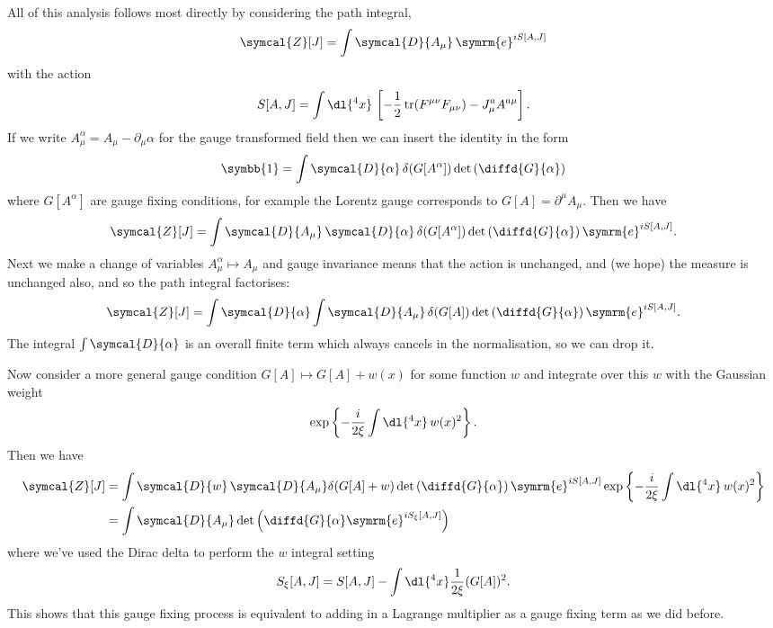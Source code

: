 \documentclass[fleqn]{NotesClass}
\newcommand{\e}{\symrm{e}}
\newcommand{\DL}[1]{\symcal{D}{#1}}
\newcommand{\DD}[1]{\,\symcal{D}{#1}}
\DeclareMathOperator{\tr}{tr}
\newcommand{\identityMatrix}{\symbb{1}}
\newcommand{\partitionFunction}{\symcal{Z}}
\begin{document}
    All of this analysis follows most directly by considering the path integral,
    \begin{equation}
        \partitionFunction[J] = \int \DL{A_\mu} \, \e^{iS[A, J]}
    \end{equation}
    with the action
    \begin{equation}
        S[A, J] = \int \dl{^4x} \, \left[ -\frac{1}{2}\tr(F^{\mu\nu} F_{\mu\nu}) - J^a_\mu A^{a\mu} \right].
    \end{equation}
    If we write \(A_\mu^\alpha = A_\mu - \partial_\mu \alpha\) for the gauge transformed field then we can insert the identity in the form
    \begin{equation}
        \identityMatrix = \int \DL{\alpha} \, \delta(G[A^\alpha]) \det\left( \diffd{G}{\alpha} \right)
    \end{equation}
    where \(G[A^\alpha]\) are gauge fixing conditions, for example the Lorentz gauge corresponds to \(G[A] = \partial^\mu A_\mu\).
    Then we have
    \begin{equation}
        \partitionFunction[J] = \int \DL{A_\mu} \DD{\alpha} \, \delta(G[A^\alpha]) \det\left( \diffd{G}{\alpha} \right) \e^{iS[A, J]}.
    \end{equation}
    Next we make a change of variables \(A_\mu^\alpha \mapsto A_\mu\) and gauge invariance means that the action is unchanged, and (we hope) the measure is unchanged also, and so the path integral factorises:
    \begin{equation}
        \partitionFunction[J] = \int\DL{\alpha} \int\DL{A_\mu} \, \delta(G[A]) \det\left( \diffd{G}{\alpha} \right) \e^{iS[A, J]}.
    \end{equation}
    The integral \(\int\DL{\alpha}\) is an overall finite term which always cancels in the normalisation, so we can drop it.
    
    Now consider a more general gauge condition \(G[A] \mapsto G[A] + w(x)\) for some function \(w\) and integrate over this \(w\) with the Gaussian weight
    \begin{equation}
        \exp\left\{ -\frac{i}{2\xi} \int \dl{^4x} \, w(x)^2 \right\}.
    \end{equation}
    Then we have
    \begin{align}
        \partitionFunction[J] &= \int \DL{w} \DD{A_\mu} \delta(G[A] + w) \det\left( \diffd{G}{\alpha} \right) \e^{iS[A, J]} \exp\left\{ -\frac{i}{2\xi} \int \dl{^4x} \, w(x)^2 \right\}\\
        &= \int \DL{A_\mu} \det\left( \diffd{G}{\alpha} \e^{iS_\xi[A, J]} \right)
    \end{align}
    where we've used the Dirac delta to perform the \(w\) integral setting
    \begin{equation}
        S_\xi[A, J] = S[A, J] - \int \dl{^4x} \frac{1}{2\xi}(G[A])^2.
    \end{equation}
    This shows that this gauge fixing process is equivalent to adding in a Lagrange multiplier as a gauge fixing term as we did before.
    
\end{document}
